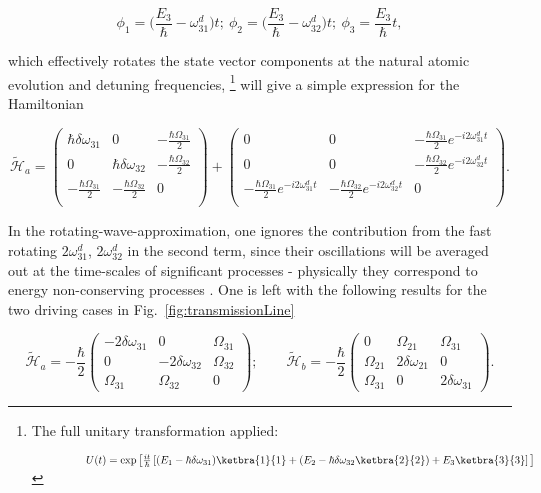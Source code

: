   \begin{equation}
  \phi_1 = \bigg(\frac{E_3}{\hbar}- \omega_{31}^d\bigg)t;\ \phi_2=\bigg(\frac{E_3}{\hbar}- \omega_{32}^d\bigg)t;\ \phi_3 = \frac{E_3}{\hbar}t,
  \label{rwaTransfomration}
  \end{equation}
  
  \noindent which effectively rotates the state vector components at the natural atomic evolution and detuning frequencies, \footnote{The full unitary transformation applied:
  	
  	$\qquad\qquad\quad U(t) = \exp\big[\frac{it}{\hbar}\left[({E_1}- \hbar\delta\omega_{31})\ketbra{1}{1}+({E_2}- \hbar\delta\omega_{32}\ketbra{2}{2})+E_{3}\ketbra{3}{3}\right]\big] $} will give a simple expression for the Hamiltonian
  
  \begin{equation}
  \widetilde{\mathcal{H}}_{a} = \begin{pmatrix}
  \hbar\delta\omega_{31} & 0 & -\frac{\hbar\Omega_{31}}{2}\\  0 & \hbar\delta\omega_{32} & -\frac{\hbar\Omega_{32}}{2} \\   	-\frac{\hbar\Omega_{31}}{2} & -\frac{\hbar\Omega_{32}}{2} & 0 \\
  \end{pmatrix} + \begin{pmatrix}
  0 & 0 & -\frac{\hbar\Omega_{31}}{2}e^{-i2\omega^{d}_{31}t}\\  0 & 0 & -\frac{\hbar\Omega_{32}}{2}e^{-i2\omega^{d}_{32}t}  \\   	-\frac{\hbar\Omega_{31}}{2}e^{-i2\omega^{d}_{31}t} & -\frac{\hbar\Omega_{32}}{2}e^{-i2\omega^{d}_{32}t} & 0 \\
  \end{pmatrix}.
  \label{rawTransformedFinal}
  \end{equation}
  
  \noindent In the rotating-wave-approximation, one ignores the contribution from the fast rotating $ 2\omega^{d}_{31} $, $ 2\omega^{d}_{32} $ in the second term, since their oscillations will be averaged out at the time-scales of significant processes - physically they correspond to energy non-conserving processes \cite{ioChunHoi}. One is left with the following results for the two driving cases in Fig.~\ref{fig:transmissionLine}
  
  \begin{equation}
  \label{rwaHamitlonianApprox}
  \widetilde{\mathcal{H}}_{a} = -\frac{\hbar}{2}\begin{pmatrix}
  -2\delta\omega_{31} & 0 & \Omega_{31}\\  0 & -2\delta\omega_{32} & \Omega_{32} \\   	\Omega_{31} & \Omega_{32} & 0
  \end{pmatrix};\qquad\widetilde{\mathcal{H}}_{b} = -\frac{\hbar}{2}\begin{pmatrix}
  0 & \Omega_{21} & \Omega_{31}\\  \Omega_{21} & 2\delta\omega_{21} & 0 \\   	\Omega_{31} & 0 & 2\delta\omega_{31}\end{pmatrix}.
  \end{equation}
  

